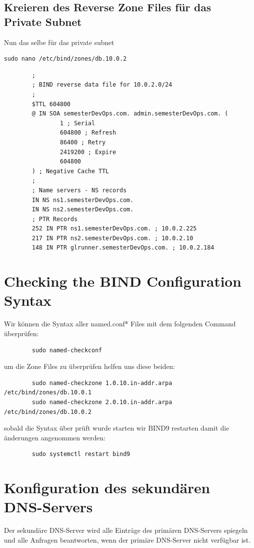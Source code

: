 \documentclass[a4paper,12pt]{article}
\begin{document}
\newpage

\subsection{Kreieren des Reverse Zone Files für das Private Subnet}
Nun das selbe für das private subnet

\begin{verbatim}
sudo nano /etc/bind/zones/db.10.0.2
\end{verbatim}

\begin{verbatim}
		;
		; BIND reverse data file for 10.0.2.0/24
		;
		$TTL 604800
		@ IN SOA semesterDevOps.com. admin.semesterDevOps.com. (
				1 ; Serial 
				604800 ; Refresh
				86400 ; Retry
				2419200 ; Expire
				604800 
		) ; Negative Cache TTL
		;
		; Name servers - NS records
		IN NS ns1.semesterDevOps.com.
		IN NS ns2.semesterDevOps.com.
		; PTR Records
		252 IN PTR ns1.semesterDevOps.com. ; 10.0.2.225
		217 IN PTR ns2.semesterDevOps.com. ; 10.0.2.10
		148 IN PTR glrunner.semesterDevOps.com. ; 10.0.2.184
\end{verbatim}

\section{Checking the BIND Configuration Syntax}
Wir können die Syntax aller named.conf* Files mit dem folgenden Command überprüfen:

\begin{verbatim}
		sudo named-checkconf
\end{verbatim}
um die Zone Files zu überprüfen helfen uns diese beiden:
\begin{verbatim}
		sudo named-checkzone 1.0.10.in-addr.arpa /etc/bind/zones/db.10.0.1
		sudo named-checkzone 2.0.10.in-addr.arpa /etc/bind/zones/db.10.0.2
\end{verbatim}
sobald die Syntax über prüft wurde starten wir BIND9 restarten damit die änderungen angenommen werden:
\begin{verbatim}
		sudo systemctl restart bind9
\end{verbatim}

\section{Konfiguration des sekundären DNS-Servers}  
Der sekundäre DNS-Server wird alle Einträge des primären DNS-Servers spiegeln 
und alle Anfragen beantworten, wenn der primäre DNS-Server nicht verfügbar ist.  
\end{document}
